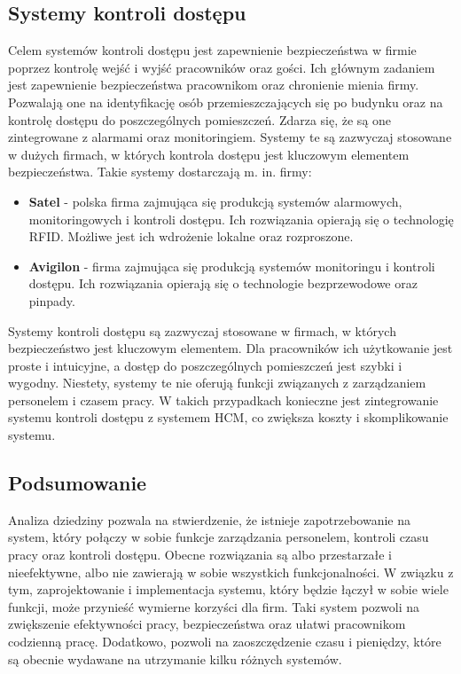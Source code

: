 \subsection{Systemy kontroli dostępu}

Celem systemów kontroli dostępu jest zapewnienie bezpieczeństwa w firmie poprzez kontrolę wejść i wyjść pracowników oraz gości. Ich głównym zadaniem jest zapewnienie bezpieczeństwa pracownikom oraz chronienie mienia firmy. Pozwalają one na identyfikację osób przemieszczających się po budynku oraz na kontrolę dostępu do poszczególnych pomieszczeń. Zdarza się, że są one zintegrowane z alarmami oraz monitoringiem. Systemy te są zazwyczaj stosowane w dużych firmach, w których kontrola dostępu jest kluczowym elementem bezpieczeństwa. Takie systemy dostarczają m. in. firmy:

\begin{itemize}
    \item \textbf{Satel} - polska firma zajmująca się produkcją systemów alarmowych, monitoringowych i kontroli dostępu. Ich rozwiązania opierają się o technologię RFID. Możliwe jest ich wdrożenie lokalne oraz rozproszone.
    \item \textbf{Avigilon} - firma zajmująca się produkcją systemów monitoringu i kontroli dostępu. Ich rozwiązania opierają się o technologie bezprzewodowe oraz pinpady.
\end{itemize}

Systemy kontroli dostępu są zazwyczaj stosowane w firmach, w których bezpieczeństwo jest kluczowym elementem. Dla pracowników ich użytkowanie jest proste i intuicyjne, a dostęp do poszczególnych pomieszczeń jest szybki i wygodny. Niestety, systemy te nie oferują funkcji związanych z zarządzaniem personelem i czasem pracy. W takich przypadkach konieczne jest zintegrowanie systemu kontroli dostępu z systemem HCM, co zwiększa koszty i skomplikowanie systemu.

\subsection{Podsumowanie}

Analiza dziedziny pozwala na stwierdzenie, że istnieje zapotrzebowanie na system, który połączy w sobie funkcje zarządzania personelem, kontroli czasu pracy oraz kontroli dostępu. Obecne rozwiązania są albo przestarzałe i nieefektywne, albo nie zawierają w sobie wszystkich funkcjonalności. W związku z tym, zaprojektowanie i implementacja systemu, który będzie łączył w sobie wiele funkcji, może przynieść wymierne korzyści dla firm. Taki system pozwoli na zwiększenie efektywności pracy, bezpieczeństwa oraz ułatwi pracownikom codzienną pracę. Dodatkowo, pozwoli na zaoszczędzenie czasu i pieniędzy, które są obecnie wydawane na utrzymanie kilku różnych systemów.

